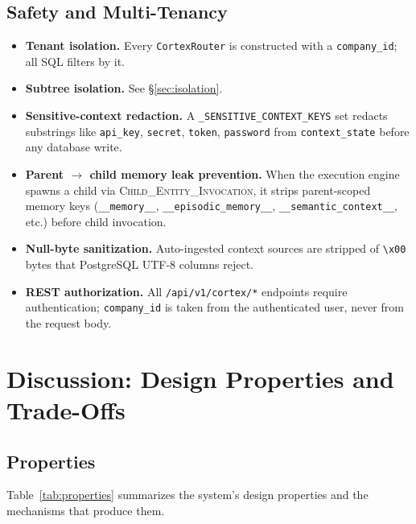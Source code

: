 \documentclass[11pt,a4paper]{article}
\theoremstyle{cortexprop}
\newcommand{\op}[1]{\textsc{#1}}
\newcommand{\code}[1]{\texttt{#1}}
\begin{document}
\subsection{Safety and Multi-Tenancy}

\begin{itemize}
  \item \textbf{Tenant isolation.} Every \code{CortexRouter} is
  constructed with a \code{company\_id}; all SQL filters by it.
  \item \textbf{Subtree isolation.} See \S\ref{sec:isolation}.
  \item \textbf{Sensitive-context redaction.} A
  \code{\_SENSITIVE\_CONTEXT\_KEYS} set redacts substrings like
  \code{api\_key}, \code{secret}, \code{token}, \code{password} from
  \code{context\_state} before any database write.
  \item \textbf{Parent $\to$ child memory leak prevention.} When the
  execution engine spawns a child via \op{Child\_Entity\_Invocation},
  it strips parent-scoped memory keys (\code{\_\_memory\_\_},
  \code{\_\_episodic\_memory\_\_}, \code{\_\_semantic\_context\_\_},
  etc.) before child invocation.
  \item \textbf{Null-byte sanitization.} Auto-ingested context sources
  are stripped of \code{\textbackslash x00} bytes that PostgreSQL UTF-8
  columns reject.
  \item \textbf{REST authorization.} All \code{/api/v1/cortex/*}
  endpoints require authentication; \code{company\_id} is taken from
  the authenticated user, never from the request body.
\end{itemize}

\section{Discussion: Design Properties and Trade-Offs}
\label{sec:discussion}

\subsection{Properties}

Table~\ref{tab:properties} summarizes the system's design properties and
the mechanisms that produce them.
\end{document}
